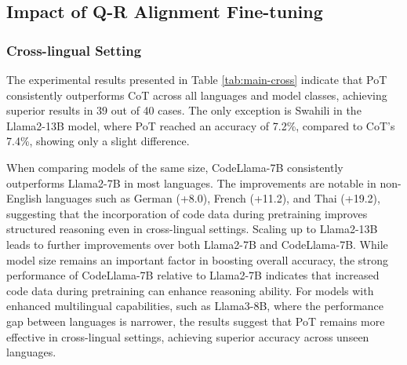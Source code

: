 \subsection{Impact of Q-R Alignment Fine-tuning}
\label{sec:QR-Alignment}
\subsubsection{Cross-lingual Setting}
The experimental results presented in Table \ref{tab:main-cross} indicate that PoT consistently outperforms CoT across all languages and model classes, achieving superior results in 39 out of 40 cases. The only exception is Swahili in the Llama2-13B model, where PoT reached an accuracy of 7.2\%, compared to CoT's 7.4\%, showing only a slight difference.
%

When comparing models of the same size, CodeLlama-7B consistently outperforms Llama2-7B in most languages. 
%
The improvements are notable in non-English languages such as German (+8.0), French (+11.2), and Thai (+19.2), suggesting that the incorporation of code data during pretraining improves structured reasoning even in cross-lingual settings.
%
Scaling up to Llama2-13B leads to further improvements over both Llama2-7B and CodeLlama-7B. 
%
While model size remains an important factor in boosting overall accuracy, the strong performance of CodeLlama-7B relative to Llama2-7B indicates that increased code data during pretraining \cite{codeLlama} can enhance reasoning ability.
%
For models with enhanced multilingual capabilities, such as Llama3-8B, where the performance gap between languages is narrower, the results suggest that PoT remains more effective in cross-lingual settings, achieving superior accuracy across unseen languages.
%
%











